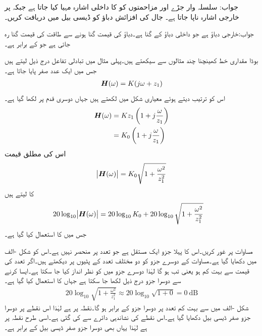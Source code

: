 جواب:
سلسلہ وار جڑے  اور  مزاحمتوں کو  کا داخلی اشارہ مہیا کیا جاتا ہے جبکہ   پر خارجی اشارہ  ناپا جاتا ہے۔ جال کی افزائش دباؤ کو ڈیسی بیل میں دریافت کریں۔

جواب:خارجی دباؤ  ہے جو داخلی دباؤ کے   گنا ہے۔دباؤ کی قیمت    گنا ہونے سے طاقت کی قیمت  گنا رہ جاتی ہے جو  کے برابر ہے۔

بوڈا مقداری خط کھینچنا چند مثالوں سے سیکھتے ہیں۔پہلی مثال میں تبادلی تفاعل درج ذیل لیتے ہیں جس میں ایک عدد صفر پایا جاتا ہے۔
\begin{align}\label{مساوات_تعددی_ایک_عدد_صفر_تفاعل_الف}
{\ensuremath{{\boldsymbol{H}}}}(\omega)=K(j\omega +z_1)
\end{align}
اس کو ترتیب دیتے ہوئے  معیاری شکل میں لکھتے ہیں جہاں دوسری قدم پر  لکھا گیا ہے۔
\begin{gather}
\begin{aligned}\label{مساوات_تعددی_ایک_عدد_صفر_تفاعل}
{\ensuremath{{\boldsymbol{H}}}}(\omega)&=K z_1\left(1+j\frac{\omega}{z_1}\right)\\
&=K_0\left(1+j\frac{\omega}{z_1}\right)
\end{aligned}
\end{gather}
اس کی مطلق قیمت
\begin{align}\label{مساوات_تعددی_ایک_عدد_صفر_تفاعل_ب}
\abs{{{\boldsymbol{H}}}(\omega)}=K_0 \sqrt{1+\frac{\omega^2}{z_1^2}}
\end{align}
کا  لیتے ہیں
\begin{align}\label{مساوات_تعددی_ایک_عدد_صفر_تفاعل_پ}
20 \log_{10}\abs{{{\boldsymbol{H}}}(\omega)}&=20 \log_{10} K_0 +20\log_{10}\sqrt{1+\frac{\omega^2}{z_1^2}}
\end{align}
جس میں  کا استعمال کیا گیا ہے۔

مساوات  پر غور کریں۔اس کا پہلا جزو ایک مستقل ہے جو تعدد پر منحصر نہیں ہے۔اس کو شکل -الف  میں دکھایا گیا ہے۔مساوات کے دوسرے جزو کو  دو مختلف تعدد کے پٹیوں پر دیکھتے ہیں۔اگر تعدد کی قیمت  سے بہت کم ہو یعنی  تب  ہو گا لہٰذا دوسرے جزو میں  کو نظر انداز کیا جا سکتا ہے۔ایسا کرنے سے دوسرا جزو درج ذیل لکھا جا سکتا ہے جہاں  کا استعمال کیا گیا ہے۔
\begin{align*}
20\log_{10}\sqrt{1+\frac{\omega^2}{z_1^2}}\approx 20\log_{10}\sqrt{1+0} =\SI{0}{\deci\bel}
\end{align*}
شکل -الف میں  سے بہت کم تعدد پر دوسرا جزو  کے برابر ہو گا۔نقطہ  پر  ہے لہٰذا اس نقطے پر دوسرا جزو صفر ڈیسی بیل دکھایا گیا ہے۔اس نقطے کی نشاندہی دائرے سے کی گئی ہے۔اسی طرح نقطہ  پر  ہے لہٰذا یہاں بھی دوسرا جزو صفر ڈیسی بیل کے برابر ہے۔


